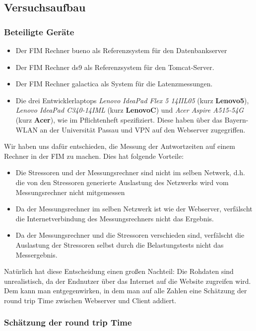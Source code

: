 
\subsection{Versuchsaufbau}

\subsubsection{Beteiligte Geräte}
\begin{itemize}
	\item Der FIM Rechner bueno als Referenzsystem für den Datenbankserver
	\item Der FIM Rechner ds9 als Referenzsystem für den Tomcat-Server.
	\item Der FIM Rechner galactica als System für die Latenzmessungen.
	\item Die drei Entwicklerlaptops \emph{Lenovo IdeaPad Flex 5 14IIL05} (kurz \textbf{Lenovo5}), \emph{Lenovo IdeaPad C340-14IML} (kurz \textbf{LenovoC}) und \emph{Acer Aspire A515-54G} (kurz \textbf{Acer}), wie im Pflichtenheft spezifiziert. Diese haben über das Bayern-WLAN an der Universität Passau und VPN auf den Webserver zugegriffen.
\end{itemize}
Wir haben uns dafür entschieden, die Messung der Antwortzeiten auf einem Rechner in der FIM zu machen. Dies hat folgende Vorteile:
\begin{itemize}
	\item Die Stressoren und der Messungsrechner sind nicht im selben Netwerk, d.h. die von den Stressoren generierte Auslastung des Netzwerks wird vom Messungsrechner nicht mitgemessen
	\item Da der Messungsrechner im selben Netzwerk ist wie der Webserver, verfälscht die Internetverbindung des Messungsrechners nicht das Ergebnis.
	\item Da der Messungsrechner und die Stressoren verschieden sind, verfälscht die Auslastung der Stressoren selbst durch die Belastungstests nicht das Messergebnis.	
\end{itemize}
Natürlich hat diese Entscheidung einen großen Nachteil: Die Rohdaten sind unrealistisch, da der Endnutzer über das Internet auf die Website zugreifen wird. Dem kann man entgegenwirken, in dem man auf alle Zahlen eine Schätzung der round trip Time zwischen Webserver und Client addiert.

\subsubsection{Schätzung der round trip Time}

